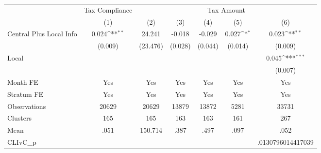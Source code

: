 {
\def\sym#1{\ifmmode^{#1}\else\(^{#1}\)\fi}
\begin{tabular}{l*{6}{c}}
\hline\hline
                &\multicolumn{1}{c}{Tax Compliance}&\multicolumn{5}{c}{Tax Amount}                                                                \\
                &\multicolumn{1}{c}{(1)}         &\multicolumn{1}{c}{(2)}         &\multicolumn{1}{c}{(3)}         &\multicolumn{1}{c}{(4)}         &\multicolumn{1}{c}{(5)}         &\multicolumn{1}{c}{(6)}         \\
\hline
Central Plus Local Info&    0.024\sym{**} &   24.241         &   -0.018         &   -0.029         &    0.027\sym{*}  &    0.023\sym{**} \\
                &  (0.009)         & (23.476)         &  (0.028)         &  (0.044)         &  (0.014)         &  (0.009)         \\
Local           &                  &                  &                  &                  &                  &    0.045\sym{***}\\
                &                  &                  &                  &                  &                  &  (0.007)         \\
Month FE        &      Yes         &      Yes         &      Yes         &      Yes         &      Yes         &      Yes         \\
Stratum FE      &      Yes         &      Yes         &      Yes         &      Yes         &      Yes         &      Yes         \\
\hline
Observations    &    20629         &    20629         &    13879         &    13872         &     5281         &    33731         \\
Clusters        &      165         &      165         &      163         &      163         &      161         &      267         \\
Mean            &     .051         &  150.714         &     .387         &     .497         &     .097         &     .052         \\
CLIvC\_p         &                  &                  &                  &                  &                  &.0130796014417039         \\
\hline\hline
\end{tabular}
}
